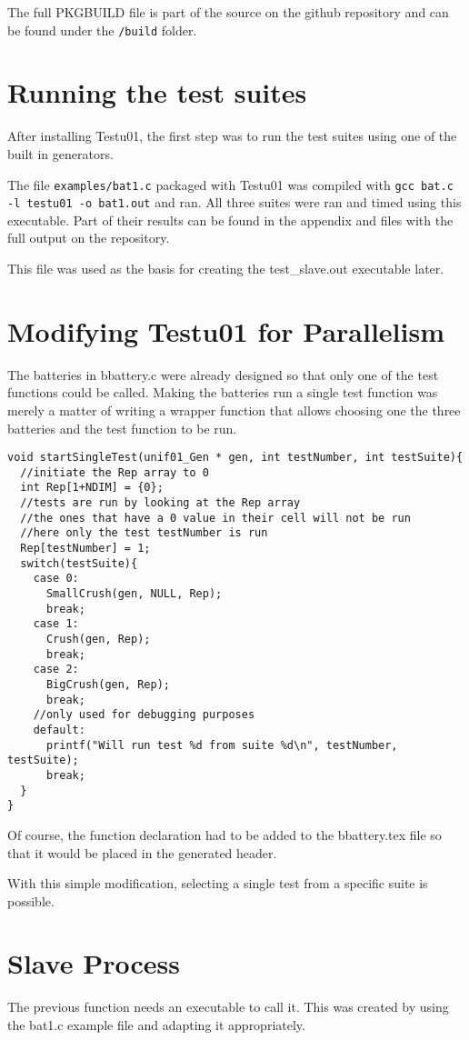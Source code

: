 The full PKGBUILD file is part of the source on the github repository\cite{github-repo} and can be found under the \texttt{/build} folder.

\section{Running the test suites}
After installing Testu01, the first step was to run the test suites using one of the built in generators.

The file \texttt{examples/bat1.c} packaged with Testu01 was compiled with \texttt{gcc bat.c -l testu01 -o bat1.out} and ran. All three suites were ran and timed using this executable. Part of their results can be found in the appendix and files with the full output on the repository\cite{githubrepo}.

This file was used as the basis for creating the test\_slave.out executable later.

\section{Modifying Testu01 for Parallelism}
The batteries in bbattery.c were already designed so that only one of the test functions could be called. Making the batteries run a single test function was merely a matter of writing a wrapper function that allows choosing one the three batteries and the test function to be run.

\begin{verbatim}
void startSingleTest(unif01_Gen * gen, int testNumber, int testSuite){
  //initiate the Rep array to 0
  int Rep[1+NDIM] = {0};
  //tests are run by looking at the Rep array
  //the ones that have a 0 value in their cell will not be run
  //here only the test testNumber is run
  Rep[testNumber] = 1;
  switch(testSuite){
    case 0:
      SmallCrush(gen, NULL, Rep);
      break;
    case 1:
      Crush(gen, Rep);
      break;
    case 2:
      BigCrush(gen, Rep);
      break;
    //only used for debugging purposes
    default:
      printf("Will run test %d from suite %d\n", testNumber, testSuite);
      break;
  }
} 
\end{verbatim}

Of course, the function declaration had to be added to the bbattery.tex file so that it would be placed in the generated header.

With this simple modification, selecting a single test from a specific suite is possible.

\section{Slave Process}
The previous function needs an executable to call it. This was created by using the bat1.c example file and adapting it appropriately.


